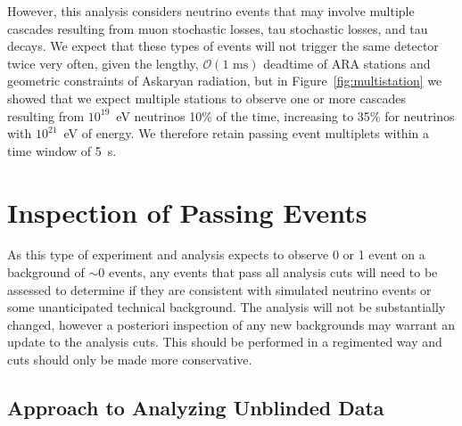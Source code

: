     However, this analysis considers neutrino events that may involve multiple cascades resulting from muon stochastic losses, tau stochastic losses, and tau decays. 
    We expect that these types of events will not trigger the same detector twice very often, given the lengthy, $\mathcal{O}(\text{1 ms})$ deadtime of ARA stations and geometric constraints of Askaryan radiation, but in Figure~\ref{fig:multistation} we showed that we expect multiple stations to observe one or more cascades resulting from $10^{19}$~eV neutrinos 10\% of the time, increasing to 35\% for neutrinos with $10^{21}$~eV of energy.
    We therefore retain passing event multiplets within a time window of 5~s. 

\pagebreak
\section{Inspection of Passing Events \label{sec:passing_events}}

    As this type of experiment and analysis expects to observe 0 or 1 event on a background of $\sim\!0$ events, any events that pass all analysis cuts will need to be assessed to determine if they are consistent with simulated neutrino events or some unanticipated technical background. 
    The analysis will not be substantially changed, however a posteriori inspection of any new backgrounds may warrant an update to the analysis cuts. 
    This should be performed in a regimented way and cuts should only be made more conservative.

    \subsection{Approach to Analyzing Unblinded Data}

